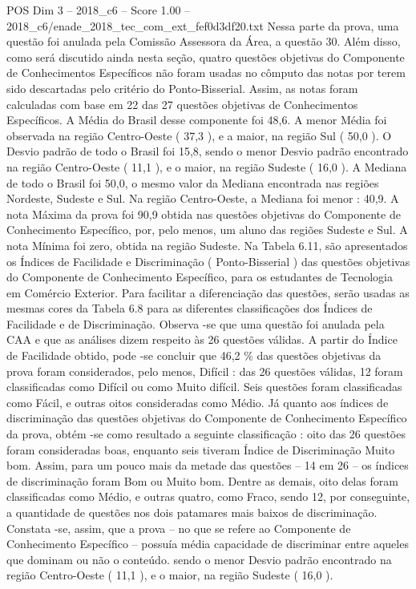 \begin{textsample}{POS Dim 3 – 2018\_c6 – Score 1.00 – 2018\_c6/enade\_2018\_tec\_com\_ext\_fef0d3df20.txt}
Nessa parte da prova, uma questão foi anulada pela Comissão Assessora da Área, a questão 30.
Além disso, como será discutido ainda nesta seção, quatro questões objetivas do Componente de Conhecimentos Específicos não foram usadas no cômputo das notas por terem sido descartadas pelo critério do Ponto-Bisserial.
Assim, as notas foram calculadas com base em 22 das 27 questões objetivas de Conhecimentos Específicos.
A Média do Brasil desse componente foi 48,6.
A menor Média foi observada na região Centro-Oeste ( 37,3 ), e a maior, na região Sul ( 50,0 ).
O Desvio padrão de todo o Brasil foi 15,8, sendo o menor Desvio padrão encontrado na região Centro-Oeste ( 11,1 ), e o maior, na região Sudeste ( 16,0 ).
A Mediana de todo o Brasil foi 50,0, o mesmo valor da Mediana encontrada nas regiões Nordeste, Sudeste e Sul.
Na região Centro-Oeste, a Mediana foi menor : 40,9.
A nota Máxima da prova foi 90,9 obtida nas questões objetivas do Componente de Conhecimento Específico, por, pelo menos, um aluno das regiões Sudeste e Sul.
A nota Mínima foi zero, obtida na região Sudeste.
Na Tabela 6.11, são apresentados os Índices de Facilidade e Discriminação ( Ponto-Bisserial ) das questões objetivas do Componente de Conhecimento Específico, para os estudantes de Tecnologia em Comércio Exterior.
Para facilitar a diferenciação das questões, serão usadas as mesmas cores da Tabela 6.8 para as diferentes classificações dos Índices de Facilidade e de Discriminação.
Observa -se que uma questão foi anulada pela CAA e que as análises dizem respeito às 26 questões válidas.
A partir do Índice de Facilidade obtido, pode -se concluir que 46,2 \% das questões objetivas da prova foram considerados, pelo menos, Difícil : das 26 questões válidas, 12 foram classificadas como Difícil ou como Muito difícil.
Seis questões foram classificadas como Fácil, e outras oitos consideradas como Médio.
Já quanto aos índices de discriminação das questões objetivas do Componente de Conhecimento Específico da prova, obtém -se como resultado a seguinte classificação : oito das 26 questões foram consideradas boas, enquanto seis tiveram Índice de Discriminação Muito bom.
Assim, para um pouco mais da metade das questões – 14 em 26 – os índices de discriminação foram Bom ou Muito bom.
Dentre as demais, oito delas foram classificadas como Médio, e outras quatro, como Fraco, sendo 12, por conseguinte, a quantidade de questões nos dois patamares mais baixos de discriminação.
Constata -se, assim, que a prova – no que se refere ao Componente de Conhecimento Específico – possuía média capacidade de discriminar entre aqueles que dominam ou não o conteúdo. sendo o menor Desvio padrão encontrado na região Centro-Oeste ( 11,1 ), e o maior, na região Sudeste ( 16,0 ).

\end{textsample}
